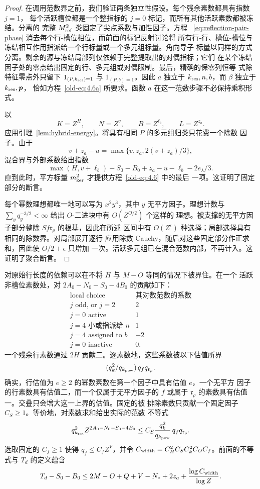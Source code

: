 \begin{proof}
在调用范数界之前，我们验证两条独立性假设。每个残余素数都具有指数 \(j=1\)，
每个活跃槽位都是一个整指标的 \(j=0\) 标记，而所有其他活跃素数都被冻结。分离的
完整 \(M_{\rm ref}^2\) 类固定了尖点系数与加性因子。方程
~\eqref{eq:reflection-pair-phase} 消去每个行-槽位相位，而前面的标记反射讨论将
所有行-行、槽位-槽位与冻结相互作用指派给一个行标量或一个多元组标量。角向导子
标量以同样的方式分离。剩余的源与冻结局部列仅依赖于完整提取出的对偶指标；它们
在某个冻结因子处的零点给出固定的行、多元组或对偶限制。最后，精确的保零列恒等
式除特征零点外只留下 \(1_{(P,k_{\rm res})=1}\) 与 \(1_{(P,b)=1}\)。因此 \(a\)
独立于 \(k_{\rm res},n,b\)，而 \(\beta\) 独立于 \(k_{\rm res},\boldsymbol p\)，
恰如方程~\eqref{old-eq:4.6a} 所要求。函数 \(a\) 在这一范数步骤不必保持乘积形式。

以
\[
 K=Z^H,\qquad N=Z^v,\qquad B=Z^{\ell_b},\qquad L=Z^{z_a}.
\]
应用引理~\ref{lem:hybrid-energy}。将具有相同 \(P\) 的多元组归类只花费一个除数
因子。由于
\[
 v+z_a-u=\max\{v,z_a,2(v+z_a)/3\},
\]
混合界与外部系数给出指数
\[
 \max(H,v+\ell_b)-S_0-B_0+z_a-u-\ell_b-2e_\lambda/3.
\]
直到此时，平方标量 \(m_{\rm ker}^2\) 才提供方程~\eqref{old-eq:4.6} 中的最后
一项。这证明了固定部分的断言。

每个幂数理想都唯一地可以写为 \(x^2y^3\)，其中 \(y\) 无平方因子。理想计数与
\(\sum_yq_y^{-3/2}<\infty\) 给出 \(O\)-二进块中有 \(O(Z^{O/2})\) 个这样的
理想。被支撑的无平方因子部分整除 \(S f\mathfrak r_\rho\) 的根基，因此在所述
区间中有 \(O(Z^\epsilon)\) 种选择；局部选择具有相同的除数界。对局部展开逐行
应用除数 Cauchy，随后对这些固定部分作正求和，因此使 \(O/2+\epsilon\) 只增加
一次。活跃多元组已在混合范数内部，不再计入。这证明了聚合断言。
\end{proof}

对原始行长度的依赖可以在不将 \(H\) 与 \(M-O\) 等同的情况下被界住。在一个
活跃非槽位素数处，对 \(2A_0-N_0-S_0-4B_0\) 的贡献如下：
\[
 \begin{array}{c|c}
 \text{local choice}&\text{其对数范数的系数}\\ \hline
 j\text{ odd, or }j=2&2\\
 j=0\text{ active}&1\\
 j=4\text{ 小或指派给 }n&1\\
 j=4\text{ assigned to }b&-2\\
 j=0\text{ inactive}&0.
 \end{array}
\]
一个残余行素数通过 \(2H\) 贡献二。逐素数地，这些系数被以下估值所界
\[
 (q_k^2/q_{k_{\rm pow}})\,q_fq_{\mathfrak r_\rho}.
\]
确实，行估值为 \(e\ge2\) 的幂数素数在第一个因子中具有估值 \(e\)，一个无平方
因子的行素数具有估值二，而一个仅属于无平方因子的 \(f\) 或属于
\(\mathfrak r_\rho\) 的素数具有估值一。交叠只会增大这一上界的估值。固定的被
排除素数只贡献一个固定因子 \(C_S\ge1\)。等价地，对素数求和给出实际的范数
不等式
\[
 q_{k_{\rm res}}^2 Z^{2A_0-N_0-S_0-4B_0}
 \le C_S\frac{q_k^2}{q_{k_{\rm pow}}}\,q_fq_{\mathfrak r_\rho}.
\]
选取固定的 \(C_f\ge1\) 使得 \(q_f\le C_fZ^V\)，并令
\(C_{\rm width}=C_H^2C_SC_k^2C_OC_f\)。前面的不等式与 \(T_d\) 的定义蕴含
\begin{equation}\label{eq:common-width-charge}
 T_d-S_0-B_0
 \le 2M-O+Q+V-N_*+2z_a+
       \frac{\log C_{\rm width}}{\log Z}.
\end{equation}

